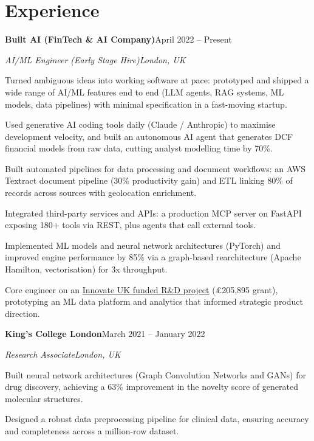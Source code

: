 \documentclass[10pt,a4paper]{article}
\newcommand{\entry}[4]{%
  {\color{company}\bfseries #1}\hfill {\color{muted}#2}\par
  \vspace{1pt}
  {\itshape #3}\hfill {\color{muted}\itshape #4}\par
  \vspace{3pt}%
}
\begin{document}
\section{Experience}
\entry{Built AI (FinTech \& AI Company)}{April 2022 -- Present}{AI/ML Engineer (Early Stage Hire)}{London, UK}
\begin{tight}
  \item Turned ambiguous ideas into working software at pace: prototyped and shipped a wide range of AI/ML features end to end (LLM agents, RAG systems, ML models, data pipelines) with minimal specification in a fast-moving startup.
  \item Used generative AI coding tools daily (Claude / Anthropic) to maximise development velocity, and built an autonomous AI agent that generates DCF financial models from raw data, cutting analyst modelling time by 70\%.
  \item Built automated pipelines for data processing and document workflows: an AWS Textract document pipeline (30\% productivity gain) and ETL linking 80\% of records across sources with geolocation enrichment.
  \item Integrated third-party services and APIs: a production MCP server on FastAPI exposing 180+ tools via REST, plus agents that call external tools.
  \item Implemented ML models and neural network architectures (PyTorch) and improved engine performance by 85\% via a graph-based rearchitecture (Apache Hamilton, vectorisation) for 3x throughput.
  \item Core engineer on an \href{https://gtr.ukri.org/projects?ref=10022996}{Innovate UK funded R\&D project} (\pounds205,895 grant), prototyping an ML data platform and analytics that informed strategic product direction.
\end{tight}

\entry{King's College London}{March 2021 -- January 2022}{Research Associate}{London, UK}
\begin{tight}
  \item Built neural network architectures (Graph Convolution Networks and GANs) for drug discovery, achieving a 63\% improvement in the novelty score of generated molecular structures.
  \item Designed a robust data preprocessing pipeline for clinical data, ensuring accuracy and completeness across a million-row dataset.
\end{tight}
\end{document}
